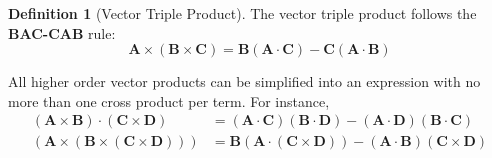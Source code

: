 \documentclass{article}
\theoremstyle{definition}
\newtheorem*{definition}{Definition}
\theoremstyle{remark}
\renewcommand{\vec}{\mathbf}
\newcommand{\veca}{\vec{A}}
\newcommand{\vecb}{\vec{B}}
\newcommand{\vecc}{\vec{C}}
\newcommand{\vecd}{\vec{D}}
\newcommand{\cross}{\times}
\begin{document}
\begin{definition}[Vector Triple Product]
The vector triple product follows the \textbf{BAC-CAB} rule:
\begin{equation}
\veca\cross(\vecb\cross\vecc)=\vecb(\veca\cdot\vecc)-\vecc(\veca\cdot\vecb)
\end{equation}
\end{definition}

\noindent All higher order vector products can be simplified into an expression with no more than one cross product per term. For instance,
\begin{equation}
\begin{split}
(\veca\cross\vecb)\cdot(\vecc\cross\vecd) &= (\veca\cdot\vecc)(\vecb\cdot\vecd) - (\veca\cdot\vecd)(\vecb\cdot\vecc) \\
(\veca\cross(\vecb\cross(\vecc\cross\vecd))) &= \vecb(\veca\cdot(\vecc\cross\vecd)) - (\veca\cdot\vecb)(\vecc\cross\vecd)
\end{split}
\end{equation}
\end{document}
